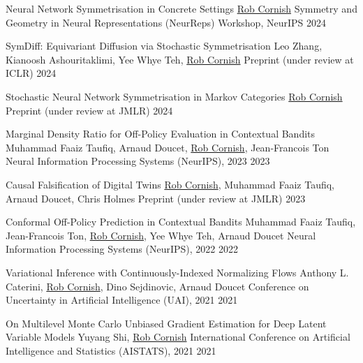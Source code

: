 \documentclass[9pt]{developercv} %
\begin{document}
\begin{entrylist}
    \publication
        {Neural Network Symmetrisation in Concrete Settings}
        {\underline{Rob Cornish}}
        {Symmetry and Geometry in Neural Representations (NeurReps) Workshop, NeurIPS}
        {2024}

    \publication
        {SymDiff: Equivariant Diffusion via Stochastic Symmetrisation}
        {Leo Zhang, Kianoosh Ashouritaklimi, Yee Whye Teh, \underline{Rob Cornish}}
        {Preprint (under review at ICLR)}
        {2024}

    \publication
        {Stochastic Neural Network Symmetrisation in Markov Categories}
        {\underline{Rob Cornish}}
        {Preprint (under review at JMLR)}
        {2024}

    \publication
        {Marginal Density Ratio for Off-Policy Evaluation in Contextual Bandits}
        {Muhammad Faaiz Taufiq, Arnaud Doucet, \underline{Rob Cornish}, Jean-Francois Ton}
        {Neural Information Processing Systems (NeurIPS), 2023}
        {2023}

    \publication
        {Causal Falsification of Digital Twins}
        {\underline{Rob Cornish}, Muhammad Faaiz Taufiq, Arnaud Doucet, Chris Holmes}
        {Preprint (under review at JMLR)}
        {2023}

    \publication
        {Conformal Off-Policy Prediction in Contextual Bandits}
        {Muhammad Faaiz Taufiq, Jean-Francois Ton, \underline{Rob Cornish}, Yee Whye Teh, Arnaud Doucet}
        {Neural Information Processing Systems (NeurIPS), 2022}
        {2022}

    \publication
        {Variational Inference with Continuously-Indexed Normalizing Flows}
        {Anthony L. Caterini, \underline{Rob Cornish}, Dino Sejdinovic, Arnaud Doucet}
        {Conference on Uncertainty in Artificial Intelligence (UAI), 2021}
        {2021}

    \publication
        {On Multilevel Monte Carlo Unbiased Gradient Estimation for Deep Latent Variable Models}
        {Yuyang Shi, \underline{Rob Cornish}}
        {International Conference on Artificial Intelligence and Statistics (AISTATS), 2021}
        {2021}



\end{entrylist}
\end{document}
